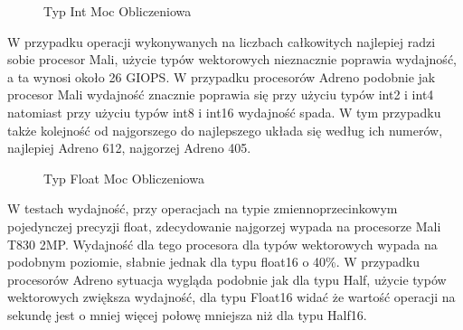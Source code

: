 \begin{figure}[H]
\caption{Typ Int Moc Obliczeniowa}
\end{figure}
W przypadku operacji wykonywanych na liczbach całkowitych najlepiej radzi sobie procesor Mali, użycie typów wektorowych nieznacznie poprawia wydajność, a ta wynosi około 26 GIOPS. W przypadku procesorów Adreno podobnie jak procesor Mali wydajność znacznie poprawia się przy użyciu typów int2 i int4 natomiast przy użyciu typów int8 i int16 wydajność spada. W tym przypadku także kolejność od najgorszego do najlepszego układa się według ich numerów, najlepiej Adreno 612, najgorzej Adreno 405.
\begin{figure}[H]
\caption{Typ Float Moc Obliczeniowa}
\end{figure}
W testach wydajność, przy operacjach na typie zmiennoprzecinkowym pojedynczej precyzji float, zdecydowanie najgorzej wypada na procesorze Mali T830 2MP. Wydajność dla tego procesora dla typów wektorowych wypada na podobnym poziomie, słabnie jednak dla typu float16 o 40\%. W przypadku procesorów Adreno sytuacja wygląda podobnie jak dla typu Half, użycie typów wektorowych zwiększa wydajność, dla typu Float16 widać że wartość operacji na sekundę jest o mniej więcej połowę mniejsza niż dla typu Half16.
